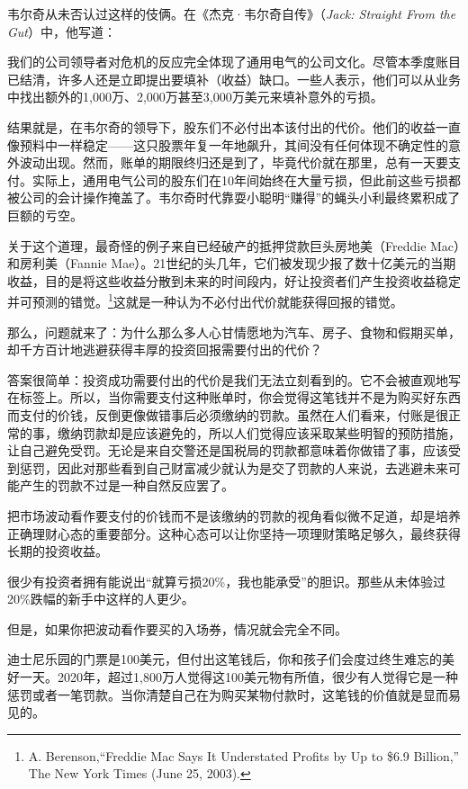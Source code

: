 韦尔奇从未否认过这样的伎俩。在《杰克·韦尔奇自传》（\textit{Jack: Straight From the Gut}）中，他写道：

{\kaishu

我们的公司领导者对危机的反应完全体现了通用电气的公司文化。尽管本季度账目已结清，许多人还是立即提出要填补（收益）缺口。一些人表示，他们可以从业务中找出额外的1,000万、2,000万甚至3,000万美元来填补意外的亏损。

}

结果就是，在韦尔奇的领导下，股东们不必付出本该付出的代价。他们的收益一直像预料中一样稳定——这只股票年复一年地飙升，其间没有任何体现不确定性的意外波动出现。然而，账单的期限终归还是到了，毕竟代价就在那里，总有一天要支付。实际上，通用电气公司的股东们在10年间始终在大量亏损，但此前这些亏损都被公司的会计操作掩盖了。韦尔奇时代靠耍小聪明“赚得”的蝇头小利最终累积成了巨额的亏空。

关于这个道理，最奇怪的例子来自已经破产的抵押贷款巨头房地美（Freddie Mac）和房利美（Fannie Mae）。21世纪的头几年，它们被发现少报了数十亿美元的当期收益，目的是将这些收益分散到未来的时间段内，好让投资者们产生投资收益稳定并可预测的错觉。\footnote{A. Berenson,“Freddie Mac Says It Understated Profits by Up to \$6.9 Billion,” The New York Times (June 25, 2003).}这就是一种认为不必付出代价就能获得回报的错觉。

那么，问题就来了：为什么那么多人心甘情愿地为汽车、房子、食物和假期买单，却千方百计地逃避获得丰厚的投资回报需要付出的代价？

答案很简单：投资成功需要付出的代价是我们无法立刻看到的。它不会被直观地写在标签上。所以，当你需要支付这种账单时，你会觉得这笔钱并不是为购买好东西而支付的价钱，反倒更像做错事后必须缴纳的罚款。虽然在人们看来，付账是很正常的事，缴纳罚款却是应该避免的，所以人们觉得应该采取某些明智的预防措施，让自己避免受罚。无论是来自交警还是国税局的罚款都意味着你做错了事，应该受到惩罚，因此对那些看到自己财富减少就认为是交了罚款的人来说，去逃避未来可能产生的罚款不过是一种自然反应罢了。

把市场波动看作要支付的价钱而不是该缴纳的罚款的视角看似微不足道，却是培养正确理财心态的重要部分。这种心态可以让你坚持一项理财策略足够久，最终获得长期的投资收益。

很少有投资者拥有能说出“就算亏损20\%，我也能承受”的胆识。那些从未体验过20\%跌幅的新手中这样的人更少。

但是，如果你把波动看作要买的入场券，情况就会完全不同。

迪士尼乐园的门票是100美元，但付出这笔钱后，你和孩子们会度过终生难忘的美好一天。2020年，超过1,800万人觉得这100美元物有所值，很少有人觉得它是一种惩罚或者一笔罚款。当你清楚自己在为购买某物付款时，这笔钱的价值就是显而易见的。


